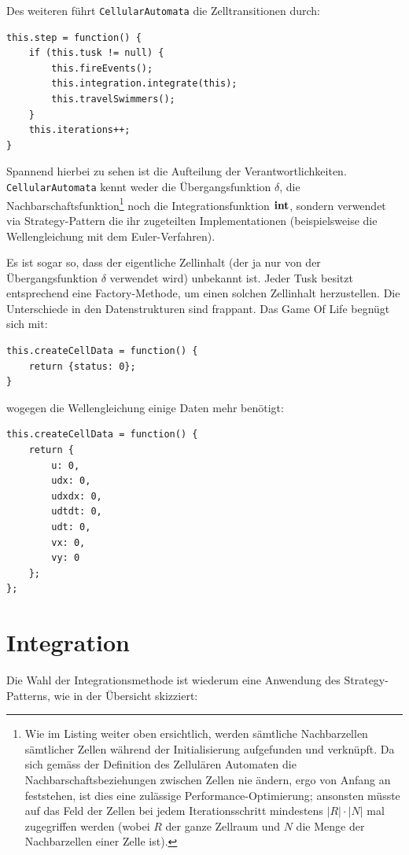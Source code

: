 \documentclass[11pt]{report} %
\theoremstyle{definition}
\begin{document}
Des weiteren führt {\tt CellularAutomata} die Zelltransitionen durch:

\begin{lstlisting}
this.step = function() {		
	if (this.tusk != null) {
		this.fireEvents();		
		this.integration.integrate(this);
		this.travelSwimmers();
	}	
	this.iterations++;	
}
\end{lstlisting}

Spannend hierbei zu sehen ist die Aufteilung der Verantwortlichkeiten. {\tt CellularAutomata} kennt weder  die Übergangsfunktion $\delta$, die Nachbarschaftsfunktion\footnote{Wie im Listing weiter oben ersichtlich, werden sämtliche Nachbarzellen sämtlicher Zellen während der Initialisierung aufgefunden und verknüpft. Da sich gemäss der Definition des Zellulären Automaten die Nachbarschaftsbeziehungen zwischen Zellen nie ändern, ergo von Anfang an feststehen, ist dies eine zulässige Performance-Optimierung; ansonsten müsste auf das Feld der Zellen bei jedem Iterationsschritt mindestens $|R|\cdot |N|$ mal zugegriffen werden (wobei $R$ der ganze Zellraum und $N$ die Menge der Nachbarzellen einer Zelle ist).} noch die Integrationsfunktion $\mathbf{int}$, sondern verwendet via Strategy-Pattern die ihr zugeteilten Implementationen (beispielsweise die Wellengleichung mit dem Euler-Verfahren).

Es ist sogar so, dass der eigentliche Zellinhalt (der ja nur von der Übergangsfunktion $\delta$ verwendet wird) unbekannt ist. Jeder Tusk besitzt entsprechend eine Factory-Methode, um einen solchen Zellinhalt herzustellen. Die Unterschiede in den Datenstrukturen sind frappant. Das Game Of Life begnügt sich mit:

\begin{lstlisting}
this.createCellData = function() {
	return {status: 0};
}
\end{lstlisting}

wogegen die Wellengleichung einige Daten mehr benötigt:
\begin{lstlisting}
this.createCellData = function() {
	return {
		u: 0,
		udx: 0,
		udxdx: 0,
		udtdt: 0,
		udt: 0,
		vx: 0,
		vy: 0
	};
};
\end{lstlisting}

\section{Integration}

Die Wahl der Integrationsmethode ist wiederum eine Anwendung des Strategy-Patterns, wie in der Übersicht skizziert:
\end{document}
